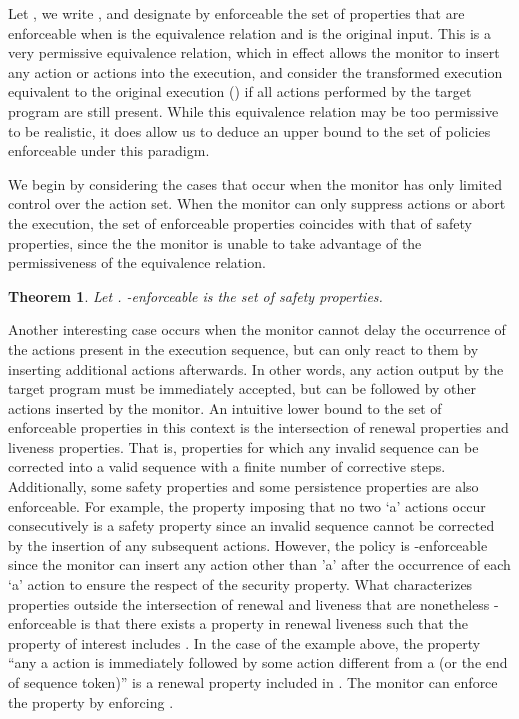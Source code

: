 \documentclass[12pt]{article}
\newtheorem{thm}{Theorem}
\begin{document}
Let , we write  , and designate by enforceable the set of properties that are enforceable when   is the equivalence relation and  is the original input. This is a very permissive equivalence relation, which in effect allows the monitor to insert any action or actions into the execution, and consider the transformed execution equivalent to the original  execution  () if all actions performed by the target program are still present.  While this equivalence relation may be too permissive to be realistic, it does allow us to deduce an upper bound to the set of policies enforceable under this paradigm.

We begin by considering the cases that occur when the monitor has only limited control over the action set. When the monitor can only suppress actions or abort the execution, the set of enforceable properties coincides with that of safety properties, since the the monitor is unable to take advantage of the permissiveness of the equivalence relation.
\begin{thm}
Let  .   -enforceable is the set of safety properties.
\end{thm}

Another interesting case occurs when the monitor cannot delay the occurrence of the actions present in the execution sequence, but can only react to them by inserting additional actions afterwards. In other words, any action output by the target program must be immediately accepted, but can be followed by other actions inserted by the monitor. An intuitive lower bound to the set of enforceable properties in this context is the intersection of renewal properties and liveness properties. That is, properties for which any invalid sequence can be corrected into a valid sequence with a finite number of corrective steps.  Additionally, some safety properties and some persistence properties are also enforceable. For example, the property   imposing that no two `a' actions occur consecutively is a safety property since an invalid sequence cannot be corrected by the insertion of any subsequent actions. However, the policy is -enforceable since the monitor can insert any action other than 'a' after the occurrence of each `a'  action to ensure the respect of the security property. What characterizes properties outside the intersection of renewal and liveness that are nonetheless -enforceable  is that there exists a property  in renewal  liveness such that the property of interest includes . In the case of the example above, the property  ``any  a action is immediately followed by some action different from a (or the end of sequence token)'' is a renewal property included in . The monitor can enforce the property  by enforcing .
\end{document}
